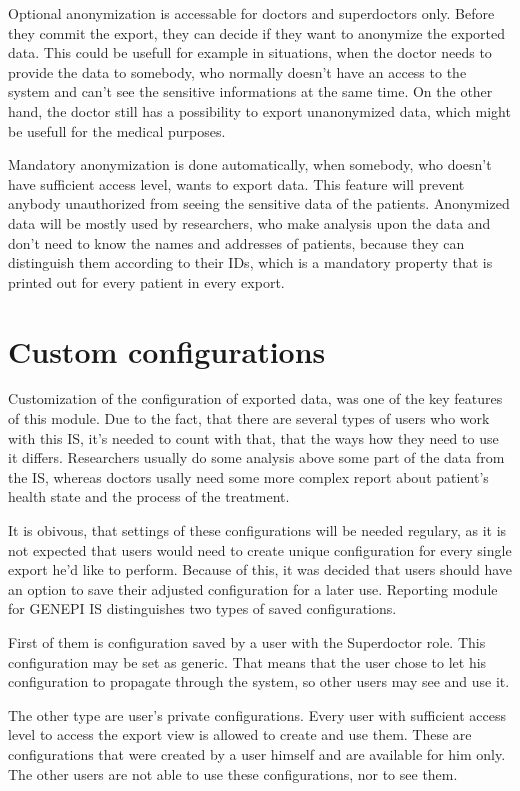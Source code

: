 \documentclass[thesis=B,english]{FITthesis}[2012/10/20]
\begin{document}
Optional anonymization is accessable for doctors and superdoctors only. Before they commit the export, they can decide if they want to anonymize the exported data. This could be usefull for example in situations, when the doctor needs to provide the data to somebody, who normally doesn't have an access to the system and can't see the sensitive informations at the same time. On the other hand, the doctor still has a possibility to export unanonymized data, which might be usefull for the medical purposes.

Mandatory anonymization is done automatically, when somebody, who doesn't have sufficient access level, wants to export data. This feature will prevent anybody unauthorized from seeing the sensitive data of the patients. Anonymized data will be mostly used by researchers, who make analysis upon the data and don't need to know the names and addresses of patients, because they can distinguish them according to their IDs, which is a mandatory property that is printed out for every patient in every export.
\section{Custom configurations}
Customization of the configuration of exported data, was one of the key features of this module. Due to the fact, that there are several types of users who work with this IS, it's needed to count with that, that the ways how they need to use it differs. Researchers usually do some analysis above some part of the data from the IS, whereas doctors usally need some more complex report about patient's health state and the process of the treatment.

It is obivous, that settings of these configurations will be needed regulary, as it is not expected that users would need to create unique configuration for every single export he'd like to perform. Because of this, it was decided that users should have an option to save their adjusted configuration for a later use. Reporting module for GENEPI IS distinguishes two types of saved configurations.

First of them is configuration saved by a user with the Superdoctor role. This configuration may be set as generic. That means that the user chose to let his configuration to propagate through the system, so other users may see and use it.

The other type are user's private configurations. Every user with sufficient access level to access the export view is allowed to create and use them. These are configurations that were created by a user himself and are available for him only. The other users are not able to use these configurations, nor to see them.
\end{document}
